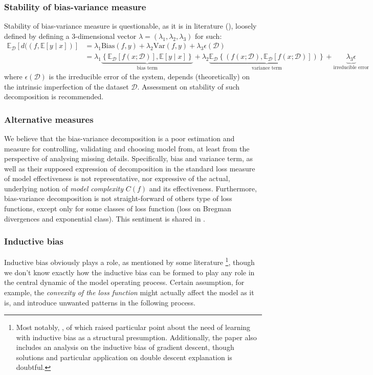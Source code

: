 \documentclass[10pt]{article} %
\begin{document}
\subsubsection{Stability of bias-variance measure}
Stability of bias-variance measure is questionable, as it is in literature (\cite{domingos_unifeid_2000}), loosely defined by defining a 3-dimensional vector $\lambda=(\lambda_{1},\lambda_{2},\lambda_{3})$ for such: 
\noindent 
\begin{equation*}
        \begin{split}
            \mathbb{E}_{\mathcal{D}} \left[d((f,\mathbb{E}[y\mid x])\right] & = \lambda_{1} \mathrm{Bias}(f,y) + \lambda_{2}\mathrm{Var}(f,y)+ \lambda_{3}\epsilon(\mathcal{D})\\ 
            & = \lambda_{1}\underbrace{\left\{ \mathbb{E}_{\mathcal{D}}[f(x;\mathcal{D})] , \mathbb{E}[y\mid x] \right\}}_{\text{bias term}} +\lambda_{2} \underbrace{\mathbb{E}_{\mathcal{D}} \left\{(f(x;\mathcal{D}), \mathbb{E}_{\mathcal{D}}[f(x;\mathcal{D})])\right\}}_{\text{variance term}} +\underbrace{\lambda_{3}\epsilon}_{\text{irreducible error}}
        \end{split}
\end{equation*}
where $\epsilon(\mathcal{D})$ is the irreducible error of the system, depends (theoretically) on the intrinsic imperfection of the dataset $\mathcal{D}$. Assessment on stability of such decomposition is recommended. 
\subsubsection{Alternative measures}
We believe that the bias-variance decomposition is a poor estimation and measure for controlling, validating and choosing model from, at least from the perspective of analysing missing details. Specifically, bias and variance term, as well as their supposed expression of decomposition in the standard loss measure of model effectiveness is not representative, nor expressive of the actual, underlying notion of \textit{model complexity} $C(f)$ and its effectiveness. Furthermore, bias-variance decomposition is not straight-forward of others type of loss functions, except only for some classes of loss function (loss on Bregman divergences and exponential class). This sentiment is shared in \cite{brown2024biasvariance}.

\subsubsection{Inductive bias}
Inductive bias obviously plays a role, as mentioned by some literature \footnote{Most notably, \cite{lafon_understanding_2024}, of which raised particular point about the need of learning with inductive bias as a structural presumption. Additionally, the paper also includes an analysis on the inductive bias of gradient descent, though solutions and particular application on double descent explanation is doubtful.}, though we don't know exactly how the inductive bias can be formed to play any role in the central dynamic of the model operating process. Certain assumption, for example, the \textit{convexity of the loss function} might actually affect the model as it is, and introduce unwanted patterns in the following process. 
\end{document}
